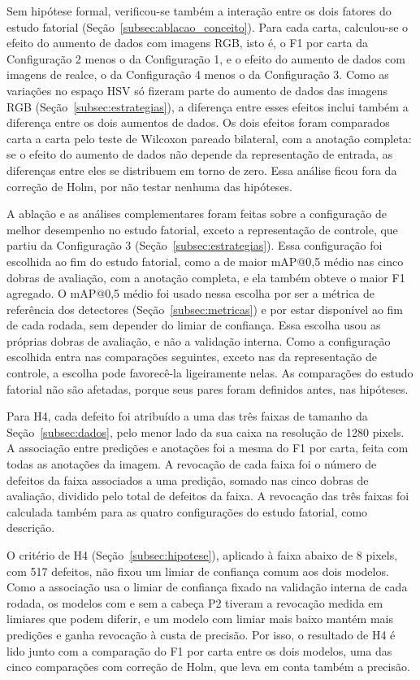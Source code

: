 \documentclass[
    12pt,                %
    openright,           %
    oneside,             %
    a4paper,             %
    english,             %
    brazil               %
]{abntex2}
\begin{document}
Sem hipótese formal, verificou-se também a
interação entre os dois fatores do estudo fatorial
(Seção~\ref{subsec:ablacao_conceito}). Para cada carta, calculou-se o
efeito do aumento de dados com imagens RGB, isto é, o F1 por carta da
Configuração 2 menos o da Configuração 1, e o efeito do aumento de
dados com imagens de realce, o da Configuração 4 menos o da
Configuração 3. Como as variações no espaço HSV só fizeram parte do
aumento de dados das imagens RGB (Seção~\ref{subsec:estrategias}), a
diferença entre esses efeitos inclui também a diferença entre os dois
aumentos de dados. Os dois efeitos foram comparados carta a carta pelo
teste de Wilcoxon pareado bilateral, com a anotação completa: se o
efeito do aumento de dados não depende da representação de entrada, as
diferenças entre eles se distribuem em torno de zero. Essa análise
ficou fora da correção de Holm, por não testar nenhuma das hipóteses.

A ablação e as análises complementares foram feitas sobre a
configuração de melhor desempenho no estudo fatorial, exceto a
representação de controle, que partiu da Configuração 3
(Seção~\ref{subsec:estrategias}). Essa
configuração foi escolhida ao fim do estudo fatorial, como a de maior
mAP@0,5 médio nas cinco dobras de avaliação, com a anotação completa,
e ela também obteve o maior F1 agregado. O mAP@0,5 médio foi usado nessa
escolha por ser a métrica de referência dos detectores
(Seção~\ref{subsec:metricas}) e por estar disponível ao fim de cada rodada, sem depender do limiar de confiança.
Essa escolha usou as próprias dobras de avaliação, e não a
validação interna. Como a configuração escolhida entra nas
comparações seguintes, exceto nas da representação de controle, a escolha pode favorecê-la ligeiramente
nelas. As comparações do estudo fatorial não são afetadas, porque seus
pares foram definidos antes, nas hipóteses.

Para H4, cada defeito foi atribuído a uma das três faixas de tamanho da
Seção~\ref{subsec:dados}, pelo menor lado da sua caixa na resolução de
1280 pixels. A associação entre predições e anotações foi a mesma do F1
por carta, feita com todas as anotações da imagem. A revocação de cada
faixa foi o número de defeitos da faixa associados a uma predição,
somado nas cinco dobras de avaliação, dividido pelo total de defeitos
da faixa. A revocação das três faixas foi calculada também para as
quatro configurações do estudo fatorial, como descrição.

O critério de H4 (Seção~\ref{subsec:hipotese}), aplicado à faixa abaixo
de 8 pixels, com 517 defeitos, não fixou um limiar de confiança comum
aos dois modelos.
Como a associação usa o limiar de confiança fixado na validação interna
de cada rodada, os modelos com e sem a cabeça P2 tiveram a revocação
medida em limiares que podem diferir, e um modelo com limiar mais baixo
mantém mais predições e ganha revocação à custa de precisão. Por isso,
o resultado de H4 é lido junto com a comparação do F1 por carta entre
os dois modelos, uma das cinco comparações com correção de Holm, que
leva em conta também a precisão.
\end{document}
